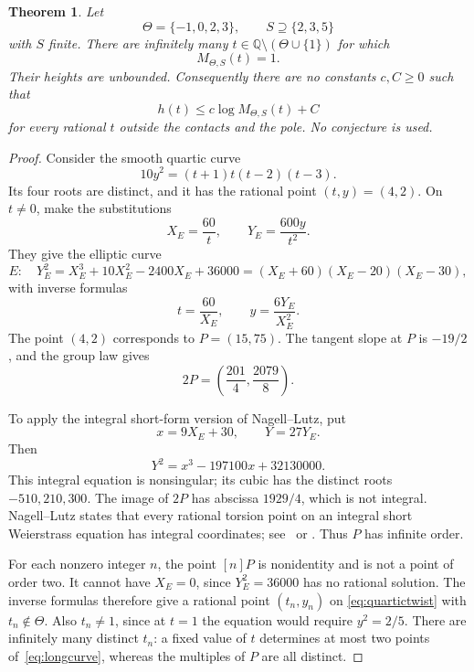 \documentclass[11pt,a4paper]{article}
\newtheorem{theorem}{Theorem}[section]
\theoremstyle{definition}\newtheorem{definition}[theorem]{Definition}
\theoremstyle{remark}\newtheorem{remark}[theorem]{Remark}
\newcommand{\Q}{\mathbb Q}\newcommand{\Z}{\mathbb Z}
\begin{document}
\begin{theorem}\label{thm:fourcounterexample}
Let
\[
                  \Theta=\{-1,0,2,3\},\qquad S\supseteq\{2,3,5\}
\]
with $S$ finite. There are infinitely many
$t\in\Q\setminus(\Theta\cup\{1\})$ for which
\[
                         M_{\Theta,S}(t)=1.
\]
Their heights are unbounded. Consequently there are no constants
$c,C\ge0$ such that
\[
                h(t)\le c\log M_{\Theta,S}(t)+C
\]
for every rational $t$ outside the contacts and the pole.
No conjecture is used.
\end{theorem}
\begin{proof}
Consider the smooth quartic curve
\begin{equation}\label{eq:quartictwist}
                   10y^2=(t+1)t(t-2)(t-3).
\end{equation}
Its four roots are distinct, and it has the rational point
$(t,y)=(4,2)$. On $t\ne0$, make the substitutions
\[
                        X_E=\frac{60}{t},\qquad
                        Y_E=\frac{600y}{t^2}.
\]
They give the elliptic curve
\begin{equation}\label{eq:longcurve}
 E:\quad Y_E^2=X_E^3+10X_E^2-2400X_E+36000
              =(X_E+60)(X_E-20)(X_E-30),
\end{equation}
with inverse formulas
\[
                         t=\frac{60}{X_E},\qquad
                         y=\frac{6Y_E}{X_E^2}.
\]
The point $(4,2)$ corresponds to $P=(15,75)$.
The tangent slope at $P$ is $-19/2$, and the group law gives
\begin{equation}\label{eq:double}
                         2P=\left(\frac{201}{4},\frac{2079}{8}\right).
\end{equation}

To apply the integral short-form version of Nagell--Lutz, put
\[
                        x=9X_E+30,\qquad Y=27Y_E.
\]
Then
\begin{equation}\label{eq:shortcurve}
                 Y^2=x^3-197100x+32130000.
\end{equation}
This integral equation is nonsingular; its cubic has the distinct
roots $-510,210,300$. The image of $2P$ has abscissa $1929/4$,
which is not integral. Nagell--Lutz states that every rational
torsion point on an integral short Weierstrass equation has
integral coordinates; see~\cite[Theorem~1.1]{Alpoge} or
\cite[Chapter~II, Theorem~5.1]{Milne}. Thus $P$ has infinite order.

For each nonzero integer $n$, the point $[n]P$ is nonidentity
and is not a point of order two. It cannot have $X_E=0$, since
$Y_E^2=36000$ has no rational solution. The inverse formulas
therefore give a rational point $(t_n,y_n)$ on
\eqref{eq:quartictwist} with $t_n\notin\Theta$.
Also $t_n\ne1$, since at $t=1$ the equation would require
$y^2=2/5$. There are infinitely many distinct $t_n$: a fixed
value of $t$ determines at most two points of~\eqref{eq:longcurve},
whereas the multiples of $P$ are all distinct.


\end{proof}
\end{document}
